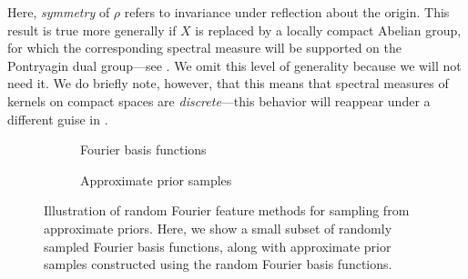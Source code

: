 \documentclass[11pt]{book}
\begin{document}
Here, \emph{symmetry} of $\rho$ refers to invariance under reflection about the origin.
This result is true more generally if $X$ is replaced by a locally compact Abelian group, for which the corresponding spectral measure will be supported on the Pontryagin dual group---see \textcite{paulsen16}. 
We omit this level of generality because we will not need it.
We do briefly note, however, that this means that spectral measures of kernels on compact spaces are \emph{discrete}---this behavior will reappear under a different guise in .

\begin{figure}
\begin{subfigure}{0.49\textwidth}

\caption{Fourier basis functions}
\end{subfigure}
\begin{subfigure}{0.49\textwidth}

\caption{Approximate prior samples}
\end{subfigure}
\caption{Illustration of random Fourier feature methods for sampling from approximate priors. Here, we show a small subset of randomly sampled Fourier basis functions, along with approximate prior samples constructed using the random Fourier basis functions.}
\label{fig:gp-rff}
\end{figure}
\end{document}
